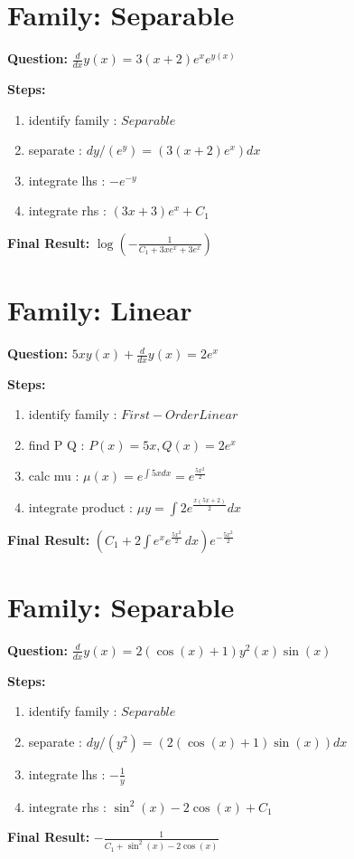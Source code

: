 \documentclass{article}
\begin{document}
\section*{Family: Separable}
\textbf{Question:} $\frac{d}{d x} y{\left(x \right)} = 3 \left(x + 2\right) e^{x} e^{y{\left(x \right)}}$

\textbf{Steps:}
\begin{enumerate}
\item identify family :  $Separable$
\item separate :  $dy / (e^{y}) = (3 \left(x + 2\right) e^{x}) dx$
\item integrate lhs :  $- e^{- y}$
\item integrate rhs :  $\left(3 x + 3\right) e^{x} + C_1$
\end{enumerate}
\textbf{Final Result:} $\log{\left(- \frac{1}{C_{1} + 3 x e^{x} + 3 e^{x}} \right)}$

\section*{Family: Linear}
\textbf{Question:} $5 x y{\left(x \right)} + \frac{d}{d x} y{\left(x \right)} = 2 e^{x}$

\textbf{Steps:}
\begin{enumerate}
\item identify family :  $First-Order Linear$
\item find P Q :  $P(x)=5 x, Q(x)=2 e^{x}$
\item calc mu :  $\mu(x) = e^{\int 5 x dx} = e^{\frac{5 x^{2}}{2}}$
\item integrate product :  $\mu y = \int 2 e^{\frac{x \left(5 x + 2\right)}{2}} dx$
\end{enumerate}
\textbf{Final Result:} $\left(C_{1} + 2 \int e^{x} e^{\frac{5 x^{2}}{2}}\, dx\right) e^{- \frac{5 x^{2}}{2}}$

\section*{Family: Separable}
\textbf{Question:} $\frac{d}{d x} y{\left(x \right)} = 2 \left(\cos{\left(x \right)} + 1\right) y^{2}{\left(x \right)} \sin{\left(x \right)}$

\textbf{Steps:}
\begin{enumerate}
\item identify family :  $Separable$
\item separate :  $dy / (y^{2}) = (2 \left(\cos{\left(x \right)} + 1\right) \sin{\left(x \right)}) dx$
\item integrate lhs :  $- \frac{1}{y}$
\item integrate rhs :  $\sin^{2}{\left(x \right)} - 2 \cos{\left(x \right)} + C_1$
\end{enumerate}
\textbf{Final Result:} $- \frac{1}{C_{1} + \sin^{2}{\left(x \right)} - 2 \cos{\left(x \right)}}$
\end{document}
